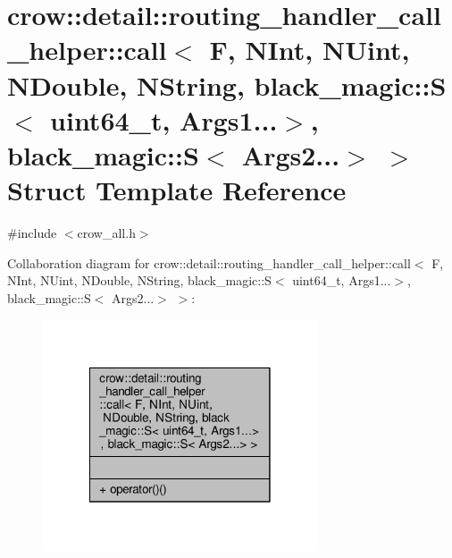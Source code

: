 \hypertarget{structcrow_1_1detail_1_1routing__handler__call__helper_1_1call_3_01_f_00_01_n_int_00_01_n_uint_00ad4e6269b7fa1968d50bbffd43a8f02}{\section{crow\-:\-:detail\-:\-:routing\-\_\-handler\-\_\-call\-\_\-helper\-:\-:call$<$ F, N\-Int, N\-Uint, N\-Double, N\-String, black\-\_\-magic\-:\-:S$<$ uint64\-\_\-t, Args1...$>$, black\-\_\-magic\-:\-:S$<$ Args2...$>$ $>$ Struct Template Reference}
\label{structcrow_1_1detail_1_1routing__handler__call__helper_1_1call_3_01_f_00_01_n_int_00_01_n_uint_00ad4e6269b7fa1968d50bbffd43a8f02}
}


{\ttfamily \#include $<$crow\-\_\-all.\-h$>$}



Collaboration diagram for crow\-:\-:detail\-:\-:routing\-\_\-handler\-\_\-call\-\_\-helper\-:\-:call$<$ F, N\-Int, N\-Uint, N\-Double, N\-String, black\-\_\-magic\-:\-:S$<$ uint64\-\_\-t, Args1...$>$, black\-\_\-magic\-:\-:S$<$ Args2...$>$ $>$\-:
\nopagebreak
\begin{figure}[H]
\begin{center}
\leavevmode
\includegraphics[width=230pt]{structcrow_1_1detail_1_1routing__handler__call__helper_1_1call_3_01_f_00_01_n_int_00_01_n_uint_0d94f4bcb948fbe2fe85f84c2a18c39fa}
\end{center}
\end{figure}
